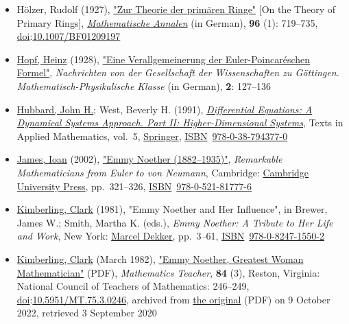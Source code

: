 \begin{itemize}
\item
  Hölzer, Rudolf (1927), {\href{https://link.springer.com/article/10.1007/BF01209197}{"Zur Theorie der primären Ringe"}} {{[}}On the Theory of Primary Rings{{]}}, \emph{\href{https://en.wikipedia.org/wiki/Mathematische_Annalen}{Mathematische Annalen}} (in German), \textbf{96} (1): {719--}735, \href{https://en.wikipedia.org/wiki/Doi_(identifier)}{doi}:\href{https://doi.org/10.1007\%2FBF01209197}{10.1007/BF01209197}{}
\item
  \href{https://en.wikipedia.org/wiki/Heinz_Hopf}{Hopf, Heinz} (1928), \href{http://www.digizeitschriften.de/index.php?id=loader&tx_jkDigiTools_pi1\%5BIDDOC\%5D=465901}{"Eine Verallgemeinerung der Euler-Poincaréschen Formel"}, \emph{Nachrichten von der Gesellschaft der Wissenschaften zu Göttingen. Mathematisch-Physikalische Klasse} (in German), \textbf{2}: {127--}136{}
\item
  \href{https://en.wikipedia.org/wiki/John_H._Hubbard}{Hubbard, John H.}; West, Beverly H. (1991), \href{https://books.google.com/books?id=SHBj2oaSALoC}{\emph{Differential Equations: A Dynamical Systems Approach. Part II: Higher-Dimensional Systems}}, Texts in Applied Mathematics, vol.{~}5, \href{https://en.wikipedia.org/wiki/Springer_Science+Business_Media}{Springer}, \href{https://en.wikipedia.org/wiki/ISBN_(identifier)}{ISBN}{~}\href{https://en.wikipedia.org/wiki/Special:BookSources/978-0-38-794377-0}{978-0-38-794377-0}{}
\item
  \href{https://en.wikipedia.org/wiki/Ioan_James}{James, Ioan} (2002), {\href{https://archive.org/details/remarkablemathem0000jame/page/321/mode/1up}{"Emmy Noether (1882--1935)"}}, \emph{Remarkable Mathematicians from Euler to von Neumann}, Cambridge: \href{https://en.wikipedia.org/wiki/Cambridge_University_Press}{Cambridge University Press}, pp.{~}{321--}326, \href{https://en.wikipedia.org/wiki/ISBN_(identifier)}{ISBN}{~}\href{https://en.wikipedia.org/wiki/Special:BookSources/978-0-521-81777-6}{978-0-521-81777-6}{}
\item
  \href{https://en.wikipedia.org/wiki/Clark_Kimberling}{Kimberling, Clark} (1981), "Emmy Noether and Her Influence", in Brewer, James W.; Smith, Martha K. (eds.), \emph{Emmy Noether: A Tribute to Her Life and Work}, New York: \href{https://en.wikipedia.org/wiki/Marcel_Dekker}{Marcel Dekker}, pp.{~}{3--}61, \href{https://en.wikipedia.org/wiki/ISBN_(identifier)}{ISBN}{~}\href{https://en.wikipedia.org/wiki/Special:BookSources/978-0-8247-1550-2}{978-0-8247-1550-2}{}
\item
  \href{https://en.wikipedia.org/wiki/Clark_Kimberling}{Kimberling, Clark} (March 1982), \href{https://ghostarchive.org/archive/20221009/http://www.matharticles.com/ma/ma069.pdf}{"Emmy Noether, Greatest Woman Mathematician"} {(PDF)}, \emph{Mathematics Teacher}, \textbf{84} (3), Reston, Virginia: National Council of Teachers of Mathematics: {246--}249, \href{https://en.wikipedia.org/wiki/Doi_(identifier)}{doi}:\href{https://doi.org/10.5951\%2FMT.75.3.0246}{10.5951/MT.75.3.0246}, archived from \href{http://www.matharticles.com/ma/ma069.pdf}{the original} {(PDF)} on 9 October 2022{, retrieved {3 September} 2020}{}

\end{itemize}
